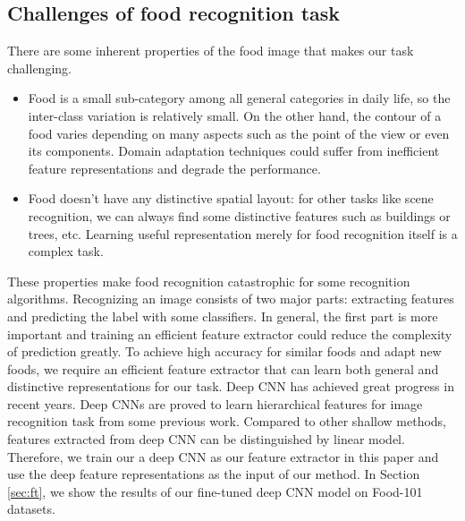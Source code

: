 \subsection{Challenges of food recognition task}
There are some inherent properties of the food image that makes our task challenging.
\begin{itemize}
 \item Food is a small sub-category among all general categories in daily life, so the inter-class variation is relatively small. On the other hand, the contour of a food varies depending on many aspects such as the point of the view or even its components. Domain adaptation techniques could suffer from inefficient feature representations and degrade the performance.
  \item Food doesn't have any distinctive spatial layout: for other tasks like scene recognition, we can always find some distinctive features such as buildings or trees, etc. Learning useful representation merely for food recognition itself is a complex task.
\end{itemize}
These properties make food recognition catastrophic for some recognition algorithms. Recognizing an image consists of two major parts: extracting features and predicting the label with some classifiers. In general, the first part is more important and training an efficient feature extractor could reduce the complexity of prediction greatly. To achieve high accuracy for similar foods and adapt new foods, we require an efficient feature extractor that can learn both general and distinctive representations for our task. Deep CNN has achieved great progress in recent years. Deep CNNs are proved to learn hierarchical features for image recognition task from some previous work\cite{zeiler2010deconvolutional}\cite{krizhevsky2012imagenet}\cite{CiresanIJCAI11}. Compared to other shallow methods, features extracted from deep CNN can be distinguished by linear model. Therefore, we train our a deep CNN as our feature extractor in this paper and use the deep feature representations as the input of our method. In Section \ref{sec:ft}, we show the results of our fine-tuned deep CNN model on Food-101 datasets. 